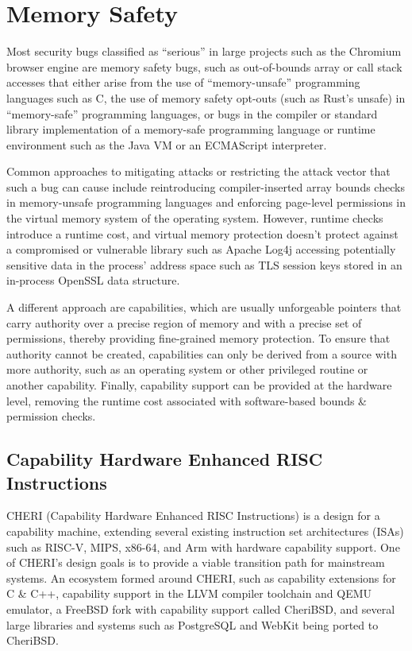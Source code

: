 \documentclass[main.tex]{subfiles}
\begin{document}
\chapter{Memory Safety}
Most security bugs classified as “serious” in large projects such as the Chromium browser engine are memory safety bugs,\cite{chromium} such as out-of-bounds array or call stack accesses that either arise from the use of “memory-unsafe” programming languages such as C, the use of memory safety opt-outs (such as Rust’s unsafe) in “memory-safe” programming languages, or bugs in the compiler or standard library implementation of a memory-safe programming language or runtime environment such as the Java VM or an ECMAScript interpreter.

Common approaches to mitigating attacks or restricting the attack vector that such a bug can cause include reintroducing compiler-inserted array bounds checks in memory-unsafe programming languages and enforcing page-level permissions in the virtual memory system of the operating system. However, runtime checks introduce a runtime cost, and virtual memory protection doesn’t protect against a compromised or vulnerable library such as Apache Log4j accessing potentially sensitive data in the process’ address space such as TLS session keys stored in an in-process OpenSSL data structure.

A different approach are capabilities, which are usually unforgeable pointers that carry authority over a precise region of memory and with a precise set of permissions, thereby providing fine-grained memory protection. To ensure that authority cannot be created, capabilities can only be derived from a source with more authority, such as an operating system or other privileged routine or another capability. Finally, capability support can be provided at the hardware level, removing the runtime cost associated with software-based bounds \& permission checks.

\section{Capability Hardware Enhanced RISC Instructions}
CHERI (Capability Hardware Enhanced RISC Instructions) is a design for a capability machine, extending several existing instruction set architectures (ISAs) such as RISC-V, MIPS, x86-64, and Arm with hardware capability support. One of CHERI’s design goals is to provide a viable transition path for mainstream systems. An ecosystem formed around CHERI, such as capability extensions for C \& C++, capability support in the LLVM compiler toolchain and QEMU emulator, a FreeBSD fork with capability support called CheriBSD, and several large libraries and systems such as PostgreSQL and WebKit being ported to CheriBSD.
\end{document}
